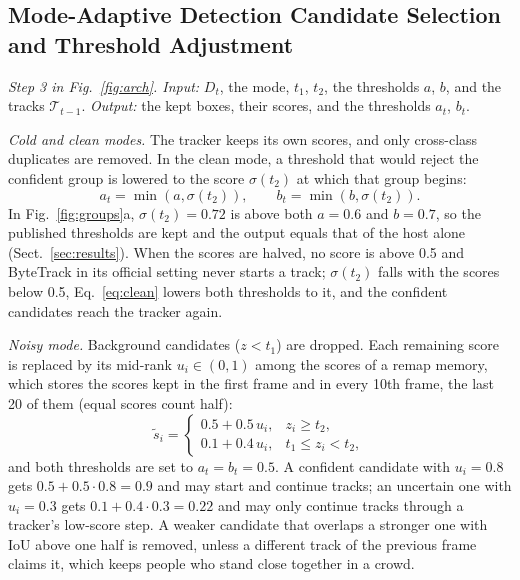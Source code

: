 \documentclass[pdflatex,sn-mathphys-num,iicol]{sn-jnl}
\begin{document}
\subsection{Mode-Adaptive Detection Candidate Selection and Threshold Adjustment}\label{sec:choice}
\emph{Step 3 in Fig.~\ref{fig:arch}. Input:} $D_t$, the mode, $t_1$, $t_2$, the thresholds $a$, $b$,
and the tracks $\mathcal{T}_{t-1}$. \emph{Output:} the kept boxes, their scores, and the thresholds
$a_t$, $b_t$.

\emph{Cold and clean modes.} The tracker keeps its own scores, and only cross-class duplicates are
removed. In the clean mode, a threshold that would reject the confident group is lowered to the
score $\sigma(t_2)$ at which that group begins:
\begin{equation}
a_t=\min\!\left(a,\sigma(t_2)\right),\qquad b_t=\min\!\left(b,\sigma(t_2)\right).
\label{eq:clean}
\end{equation}
In Fig.~\ref{fig:groups}a, $\sigma(t_2)=0.72$ is above both $a=0.6$ and $b=0.7$, so the published
thresholds are kept and the output equals that of the host alone (Sect.~\ref{sec:results}). When the
scores are halved, no score is above 0.5 and ByteTrack in its official setting never starts a track;
$\sigma(t_2)$ falls with the scores below 0.5, Eq.~\eqref{eq:clean} lowers both thresholds to it, and
the confident candidates reach the tracker again.

\emph{Noisy mode.} Background candidates ($z<t_1$) are dropped. Each remaining score is replaced by
its mid-rank $u_i\in(0,1)$ among the scores of a remap memory, which stores the scores kept in the
first frame and in every 10th frame, the last 20 of them (equal scores count half):
\begin{equation}
\tilde{s}_i=
\begin{cases}
0.5+0.5\,u_i, & z_i\ge t_2,\\
0.1+0.4\,u_i, & t_1\le z_i<t_2,
\end{cases}
\label{eq:remap}
\end{equation}
and both thresholds are set to $a_t=b_t=0.5$. A confident candidate with $u_i=0.8$ gets
$0.5+0.5\cdot0.8=0.9$ and may start and continue tracks; an uncertain one with $u_i=0.3$ gets
$0.1+0.4\cdot0.3=0.22$ and may only continue tracks through a tracker's low-score step. A weaker
candidate that overlaps a stronger one with IoU above one half is removed, unless a different track of
the previous frame claims it, which keeps people who stand close together in a crowd.
\end{document}
